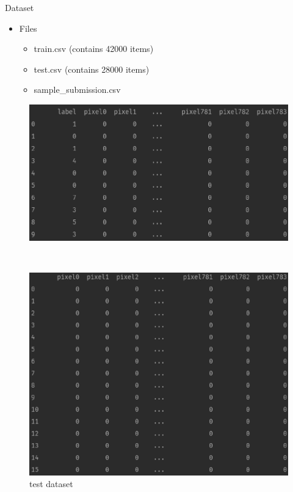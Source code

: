 \documentclass[
 size=12pt,
 paper=smartboard, %
 mode=present, %
 display=slides, %
style=tuliplab,
pauseslide,
fleqn,leqno]{powerdot}
\begin{document}
\begin{slide}{Dataset}
  \begin{itemize}
    \item Files\pause
      \begin{itemize}
        \item train.csv (contains 42000 items)
        \item test.csv (contains 28000 items)
        \item sample_submission.csv
      \end{itemize}
  \end{itemize}
  \pause
  \begin{figure}[h]
    \begin{minipage}[t]{0.4\linewidth}
    \centering
    \includegraphics[width=1.2\textwidth]{figures/data-train.eps}
    \caption{train dataset}
    \label{fig:train-dataset}
    \end{minipage} 
    \hfill
    \begin{minipage}[t]{0.4\linewidth}
    \centering
    \includegraphics[width=1.2\textwidth]{figures/data-test.eps}
    \caption{test dataset}
    \label{fig:test-dataset}
    \end{minipage}
  \end{figure}
\end{slide}
\end{document}
